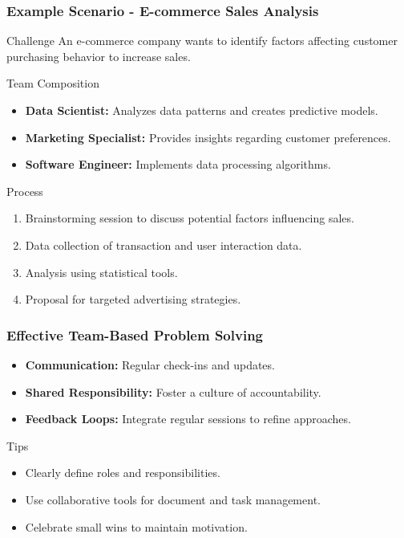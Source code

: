 \documentclass{beamer}
\begin{document}
\begin{frame}[fragile]
    \frametitle{Example Scenario - E-commerce Sales Analysis}
    \begin{block}{Challenge}
        An e-commerce company wants to identify factors affecting customer purchasing behavior to increase sales.
    \end{block}
    
    \begin{block}{Team Composition}
        \begin{itemize}
            \item \textbf{Data Scientist:} Analyzes data patterns and creates predictive models.
            \item \textbf{Marketing Specialist:} Provides insights regarding customer preferences.
            \item \textbf{Software Engineer:} Implements data processing algorithms.
        \end{itemize}
    \end{block}
    
    \begin{block}{Process}
        \begin{enumerate}
            \item Brainstorming session to discuss potential factors influencing sales.
            \item Data collection of transaction and user interaction data.
            \item Analysis using statistical tools.
            \item Proposal for targeted advertising strategies.
        \end{enumerate}
    \end{block}
\end{frame}

\begin{frame}[fragile]
    \frametitle{Effective Team-Based Problem Solving}
    \begin{itemize}
        \item \textbf{Communication:} Regular check-ins and updates.
        \item \textbf{Shared Responsibility:} Foster a culture of accountability.
        \item \textbf{Feedback Loops:} Integrate regular sessions to refine approaches.
    \end{itemize}
    
    \begin{block}{Tips}
        \begin{itemize}
            \item Clearly define roles and responsibilities.
            \item Use collaborative tools for document and task management.
            \item Celebrate small wins to maintain motivation.
        \end{itemize}
    \end{block}
\end{frame}
\end{document}
